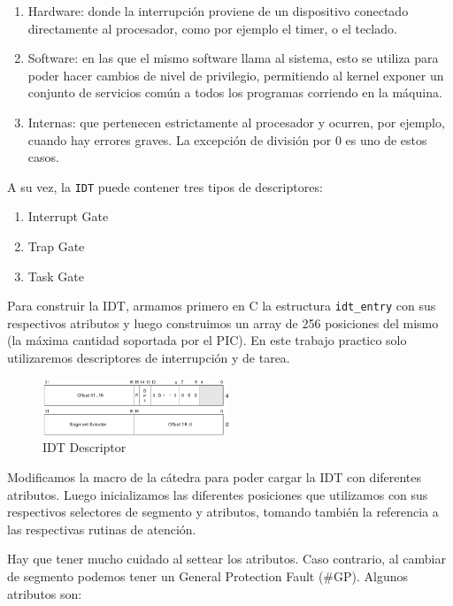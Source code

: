 \begin{enumerate}
\item Hardware: donde la interrupción proviene de un dispositivo conectado directamente al procesador, como por ejemplo el timer, o el teclado.
\item Software: en las que el mismo software llama al sistema, esto se utiliza para poder hacer cambios de nivel de privilegio, permitiendo al kernel exponer un conjunto de servicios común a todos los programas corriendo en la máquina.
\item Internas: que pertenecen estrictamente al procesador y ocurren, por ejemplo, cuando hay errores graves. La excepción de división por 0 es uno de estos casos.
\end{enumerate}

A su vez, la \texttt{IDT} puede contener tres tipos de descriptores:

\begin{enumerate}
\item Interrupt Gate
\item Trap Gate
\item Task Gate
\end{enumerate}

Para construir la IDT, armamos primero en C la estructura \texttt{idt\_entry} con sus respectivos atributos y luego construimos un array de 256 posiciones del mismo (la máxima cantidad soportada por el PIC). En este trabajo practico solo utilizaremos descriptores de interrupción y de tarea.

\begin{figure}[h!]
  \centering
    \includegraphics[width=0.5\textwidth]{images/idt_desc}
  \caption{IDT Descriptor}
\end{figure}

Modificamos la macro de la cátedra para poder cargar la IDT con diferentes atributos. Luego inicializamos las diferentes posiciones que utilizamos con sus respectivos selectores de segmento y atributos, tomando también la referencia a las respectivas rutinas de atención.

Hay que tener mucho cuidado al settear los atributos. Caso contrario, al cambiar de segmento podemos tener un General Protection Fault (\#GP). Algunos atributos son:

